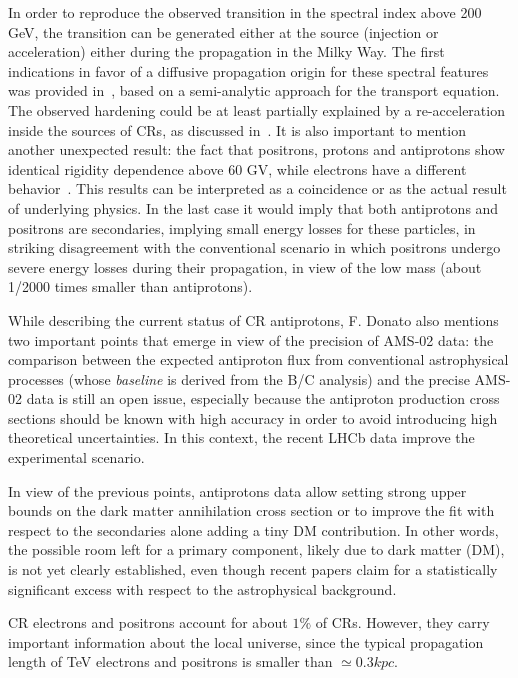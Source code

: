 \documentclass{PoS}
\begin{document}
\begin{itemize}
In order to reproduce the observed transition in the spectral index above 200 GeV, the transition can be generated  either at the source (injection or acceleration) 
either during the propagation in the Milky Way. The first indications in favor of a diffusive propagation origin for these spectral features was provided in~\cite{Genolini:2017dfb}, based on a semi-analytic approach for the transport equation. 
The observed hardening could be at least partially explained by a re-acceleration inside the sources of CRs, as discussed in~\cite{Blasi:2017caw}.
It is also important to mention another unexpected result: the fact that positrons, protons and antiprotons show identical rigidity dependence above 60 GV, while electrons have a different behavior~\cite{antip}. This results can be interpreted as a  coincidence or as the actual result of underlying physics. In the last case it would imply that both antiprotons and positrons are secondaries, implying small energy losses for these particles, in striking disagreement with the conventional scenario in which positrons undergo severe energy losses during their propagation, in view of the low mass (about 1/2000 times smaller than antiprotons).

While describing the current status of CR antiprotons, F. Donato also mentions two important points that emerge in view of the precision of AMS-02 data: the comparison between the expected antiproton flux from conventional astrophysical processes (whose \textit{baseline} is derived from the B/C analysis) and the precise AMS-02 data is still an open issue, especially because the antiproton production cross sections should be known with high accuracy in order to avoid introducing high theoretical uncertainties. 
In this context, the recent  LHCb data improve the experimental scenario. 

In view of the previous points, antiprotons data allow setting strong upper bounds on the dark matter annihilation cross section or to improve the fit with respect to the secondaries 
alone adding a tiny DM contribution. 
In other words, the possible room left for a primary component, likely due to dark matter (DM), is not yet clearly established, even though recent papers claim for a statistically significant excess with respect to the astrophysical background. 

CR electrons and positrons account for about $1\%$ of CRs. However, they carry important information about the
local universe, since the typical propagation length of TeV electrons and positrons is smaller than $\simeq 0.3 kpc$. 


\end{itemize}
\end{document}
